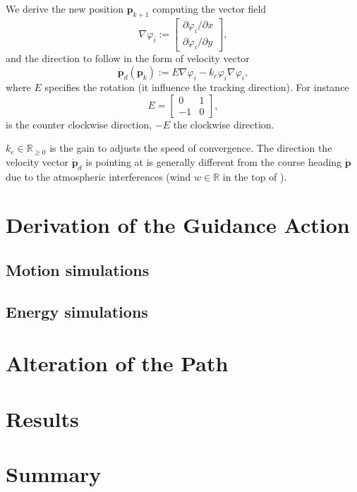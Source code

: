 We derive the new position $\mathbf{p}_{k+1}$ computing the vector field 
 \begin{equation}
   \nabla\varphi_i:=\begin{bmatrix}\partial\varphi_i/\partial x \\ \partial\varphi_i/\partial y\end{bmatrix},  
 \end{equation}
 and the direction to follow in the form of velocity vector~\cite{de2017guidance}
 \begin{equation}\label{eq:pd}
   \dot{\mathbf{p}}_d(\mathbf{p}_k):=E\nabla\varphi_i-k_e\varphi_i\nabla\varphi_i,
 \end{equation}
 where $E$ specifies the rotation (it influence the tracking direction). For instance
 \begin{equation}
   E=\begin{bmatrix}
     0&1\\-1&0
   \end{bmatrix},
 \end{equation}
 is the counter clockwise direction, $-E$ the clockwise direction. 
 
 $k_e\in\mathbb{R}_{\geq 0}$ is the gain to adjusts the speed of convergence. The direction the velocity vector $\dot{\mathbf{p}}_d$ is pointing at is generally different from the course heading $\dot{\mathbf{p}}$ due to the atmospheric interferences (wind $w\in\mathbb{R}$ in the top of ).

\section{\color{red}Derivation of the Guidance Action}

\subsection{\color{red}Motion simulations}

\subsection{\color{red}Energy simulations}


\section{\color{red}Alteration of the Path}


\section{\color{red}Results}


\section{\color{red}Summary}

